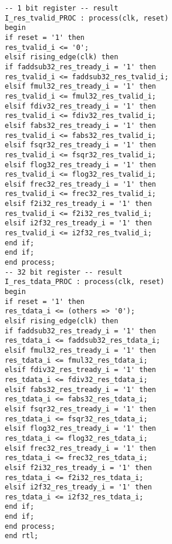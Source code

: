 \documentclass[conference]{IEEEtran}
\begin{document}
\begin{lstlisting}
-- 1 bit register -- result
I_res_tvalid_PROC : process(clk, reset)
begin
if reset = '1' then 
res_tvalid_i <= '0';
elsif rising_edge(clk) then
if faddsub32_res_tready_i = '1' then
res_tvalid_i <= faddsub32_res_tvalid_i;
elsif fmul32_res_tready_i = '1' then
res_tvalid_i <= fmul32_res_tvalid_i;
elsif fdiv32_res_tready_i = '1' then
res_tvalid_i <= fdiv32_res_tvalid_i;
elsif fabs32_res_tready_i = '1' then
res_tvalid_i <= fabs32_res_tvalid_i;
elsif fsqr32_res_tready_i = '1' then
res_tvalid_i <= fsqr32_res_tvalid_i;
elsif flog32_res_tready_i = '1' then
res_tvalid_i <= flog32_res_tvalid_i;
elsif frec32_res_tready_i = '1' then
res_tvalid_i <= frec32_res_tvalid_i;
elsif f2i32_res_tready_i = '1' then
res_tvalid_i <= f2i32_res_tvalid_i;
elsif i2f32_res_tready_i = '1' then
res_tvalid_i <= i2f32_res_tvalid_i;
end if;
end if;
end process;
-- 32 bit register -- result
I_res_tdata_PROC : process(clk, reset)
begin 
if reset = '1' then 
res_tdata_i <= (others => '0');
elsif rising_edge(clk) then
if faddsub32_res_tready_i = '1' then
res_tdata_i <= faddsub32_res_tdata_i;
elsif fmul32_res_tready_i = '1' then
res_tdata_i <= fmul32_res_tdata_i;
elsif fdiv32_res_tready_i = '1' then
res_tdata_i <= fdiv32_res_tdata_i;
elsif fabs32_res_tready_i = '1' then
res_tdata_i <= fabs32_res_tdata_i;
elsif fsqr32_res_tready_i = '1' then
res_tdata_i <= fsqr32_res_tdata_i;
elsif flog32_res_tready_i = '1' then
res_tdata_i <= flog32_res_tdata_i;
elsif frec32_res_tready_i = '1' then
res_tdata_i <= frec32_res_tdata_i;
elsif f2i32_res_tready_i = '1' then
res_tdata_i <= f2i32_res_tdata_i;
elsif i2f32_res_tready_i = '1' then
res_tdata_i <= i2f32_res_tdata_i;
end if;
end if;
end process;
end rtl;
	\end{lstlisting}	
\end{document}
